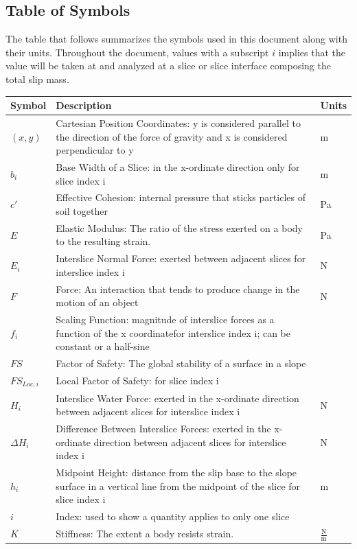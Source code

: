 \documentclass[12pt]{article}
\begin{document}
\subsection{Table of Symbols}
\label{Sec:TablofSymb}
The table that follows summarizes the symbols used in this document along with their units. Throughout the document, values with a subscript $i$ implies that the value will be taken at and analyzed at a slice or slice interface composing the total slip mass.
\begin{longtable*}{l l l}
\toprule
Symbol & Description & Units
\\
\midrule
$(x,y)$ & Cartesian Position Coordinates: y is considered parallel to the direction of the force of gravity and x is considered perpendicular to y & m
\\
$b_{i}$ & Base Width of a Slice: in the x-ordinate direction only for slice index i & m
\\
$c'$ & Effective Cohesion: internal pressure that sticks particles of soil together & Pa
\\
$E$ & Elastic Modulus: The ratio of the stress exerted on a body to the resulting strain. & Pa
\\
$E_{i}$ & Interslice Normal Force: exerted between adjacent slices for interslice index i & N
\\
$F$ & Force: An interaction that tends to produce change in the motion of an object & N
\\
$f_{i}$ & Scaling Function: magnitude of interslice forces as a function of the x coordinatefor interslice index i; can be constant or a half-sine & 
\\
$FS$ & Factor of Safety: The global stability of a surface in a slope & 
\\
$FS_{Loc,i}$ & Local Factor of Safety: for slice index i & 
\\
$H_{i}$ & Interslice Water Force: exerted in the x-ordinate direction between adjacent slices for interslice index i & N
\\
$\Delta{}H_{i}$ & Difference Between Interslice Forces: exerted in the x-ordinate direction between adjacent slices for interslice index i & N
\\
$h_{i}$ & Midpoint Height: distance from the slip base to the slope surface in a vertical line from the midpoint of the slice for slice index i & m
\\
$i$ & Index: used to show a quantity applies to only one slice & 
\\
$K$ & Stiffness: The extent a body resists strain. & $\frac{\text{N}}{\text{m}}$

\end{longtable*}
\end{document}

